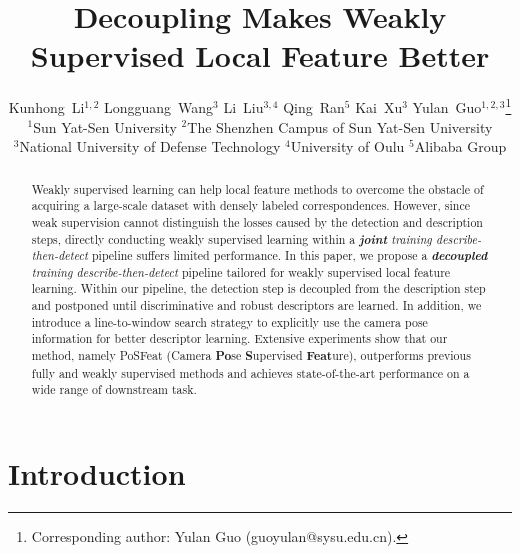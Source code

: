\documentclass[10pt,twocolumn,letterpaper]{article}
\begin{document}
\title{Decoupling Makes Weakly Supervised Local Feature Better}

\author{Kunhong~Li$^{1,2}$\quad
        Longguang~Wang$^{3}$\quad
        Li~Liu$^{3,4}$\quad 
        Qing~Ran$^5$\quad
        Kai~Xu$^3$\quad
        Yulan~Guo$^{1,2,3}$\thanks{Corresponding author: Yulan Guo (guoyulan@sysu.edu.cn).}\\
        $^1$Sun Yat-Sen University
        \quad
        $^2$The Shenzhen Campus of Sun Yat-Sen University\\
        $^3$National University of Defense Technology
        \quad
        $^4$University of Oulu
        \quad
        $^5$Alibaba Group
}
\maketitle

\begin{abstract}
Weakly supervised learning can help local feature methods to overcome the obstacle of acquiring a large-scale dataset with densely labeled correspondences. However, since weak supervision cannot distinguish the losses caused by the detection and description steps, directly conducting weakly supervised learning within a \textit{\textbf{joint} training describe-then-detect} pipeline suffers limited performance. In this paper, we propose a \textit{\textbf{decoupled} training describe-then-detect} pipeline tailored for weakly supervised local feature learning. Within our pipeline, the detection step is decoupled from the description step and postponed until discriminative and robust descriptors are learned. In addition, we introduce a line-to-window search strategy to explicitly use the camera pose information for better descriptor learning. Extensive experiments show that our method, namely PoSFeat (Camera \textbf{Po}se \textbf{S}upervised \textbf{Feat}ure), outperforms previous fully and weakly supervised methods and achieves state-of-the-art performance on a wide range of downstream task. \let\thefootnote\relax{}
\end{abstract}

\section{Introduction}
\end{document}
